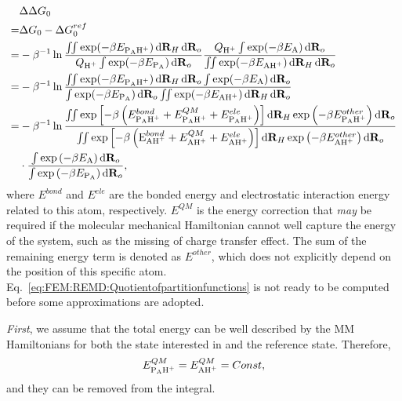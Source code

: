 \begin{align}
	&\Delta\Delta G_{0}\nonumber\\
	= & \Delta G_{0}-\Delta G_{0}^{ref}\nonumber \\
	= & -\beta^{-1}\ln\frac{\iint\exp(-\beta E_{\ce{P_{A}H^{+}}})\diff \mathbf{R}_{H}\diff \mathbf{R}_{o}}{Q_{\ce{H^{+}}}\int\exp(-\beta E_{\ce{P_{A}}})\diff \mathbf{R}_{o}}\frac{Q_{\ce{H^{+}}}\int\exp(-\beta E_{\ce{A}})\diff \mathbf{R}_{o}}{\iint\exp(-\beta E_{\ce{AH^{+}}})\diff \mathbf{R}_{H}\diff \mathbf{R}_{o}}\nonumber \\
	= & -\beta^{-1}\ln\frac{\iint\exp(-\beta E_{\ce{P_{A}H^{+}}})\diff \mathbf{R}_{H}\diff \mathbf{R}_{o}\int\exp(-\beta E_{\ce{A}})\diff \mathbf{R}_{o}}{\int\exp(-\beta E_{\ce{P_{A}}})\diff \mathbf{R}_{o}\iint\exp(-\beta E_{\ce{AH^{+}}})\diff \mathbf{R}_{H}\diff \mathbf{R}_{o}}\nonumber \\
	= & -\beta^{-1}\ln\frac{\iint\exp{\left[-\beta \left(E_{\ce{P_{A}H^{+}}}^{bond}+E_{\ce{P_{A}H^{+}}}^{QM}+E_{\ce{P_{A}H^{+}}}^{ele}\right)\right]}\diff \mathbf{R}_{H}\exp\left(-\beta E_{\ce{P_{A}H^{+}}}^{other}\right)\diff \mathbf{R}_{o}}{\iint\exp\left[-\beta \left(\ce{E_{AH^{+}}}^{bond}+E_{\ce{AH^{+}}}^{QM}+E_{\ce{AH^{+}}}^{ele}\right)\right]\diff \mathbf{R}_{H}\exp\left(-\beta E_{\ce{AH^{+}}}^{other}\right)\diff \mathbf{R}_{o}}\nonumber \\
	 & \cdot\frac{\int\exp\left(-\beta E_{\ce{A}}\right)\diff \mathbf{R}_{o}}{\int\exp\left(-\beta E_{\ce{P_{A}}}\right)\diff \mathbf{R}_{o}},\label{eq:FEM:REMD:Quotientofpartitionfunctions}
\end{align}
where $E^{bond}$
and $E^{ele}$ are the bonded energy and electrostatic interaction
energy related to this  atom, respectively. $E^{QM}$ is the energy
correction that \textit{may} be required if the molecular mechanical
Hamiltonian cannot well capture the energy of the system, such as
the missing of charge transfer effect. The sum of the remaining energy
term is denoted as $E^{other}$, which does not explicitly depend
on the position of this specific  atom. Eq.~\ref{eq:FEM:REMD:Quotientofpartitionfunctions}
is not ready to be computed before some approximations are adopted. 

\textit{First}, we assume that the total energy can be well described by the MM Hamiltonians
for both the state interested in and the reference state. Therefore,
\[
E_{\ce{P_{A}H^{+}}}^{QM}=E_{\ce{AH^{+}}}^{QM}=Const,
\]
and they can be removed from the integral. 

